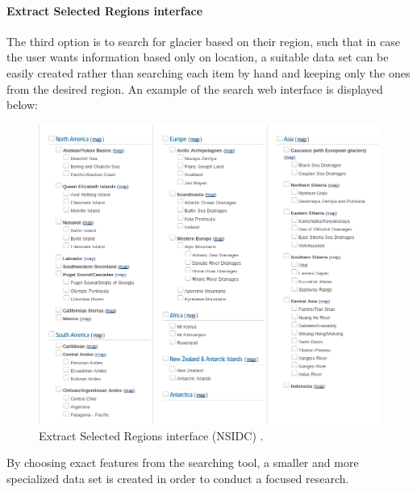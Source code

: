 \documentclass[12pt, a4paper]{report}
\begin{document}
	\paragraph{Extract Selected Regions interface}
	The third option is to search for glacier based on their region, such that in case the user wants information based only on location, a suitable data set can be easily created rather than searching each item by hand and keeping only the ones from the desired region. An example of the search web interface is displayed below:
	\begin{figure}[H]
		\centering
		\includegraphics[scale=1.7]{ndsic_2.png}
		\caption{Extract Selected Regions interface (NSIDC) \cite{nsidc_2}.}
		\label{fig:NSIDC_extract}
	\end{figure}
	By choosing exact features from the searching tool, a smaller and more specialized data set is created in order to conduct a focused research.
	
\end{document}
